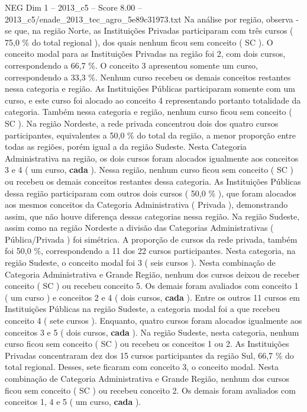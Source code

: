 \begin{textsample}{NEG Dim 1 – 2013\_c5 – Score 8.00 – 2013\_c5/enade\_2013\_tec\_agro\_5e89c31973.txt}
Na análise por região, observa -se que, na região Norte, as Instituições Privadas participaram com três cursos ( 75,0 \% do total regional ), dos quais nenhum ficou sem conceito ( SC ).
O conceito modal para as Instituições Privadas na região foi 2, com dois cursos, correspondendo a 66,7 \%.
O conceito 3 apresentou somente um curso, correspondendo a 33,3 \%.
Nenhum curso recebeu os demais conceitos restantes nessa categoria e região.
As Instituições Públicas participaram somente com um curso, e este curso foi alocado ao conceito 4 representando portanto totalidade da categoria.
Também nessa categoria e região, nenhum curso ficou sem conceito ( SC ).
Na região Nordeste, a rede privada concentrou dois dos quatro cursos participantes, equivalentes a 50,0 \% do total da região, a menor proporção entre todas as regiões, porém igual a da região Sudeste.
Nesta Categoria Administrativa na região, os dois cursos foram alocados igualmente aos conceitos 3 e 4 ( um curso, \textbf{cada} ).
Nessa região, nenhum curso ficou sem conceito ( SC ) ou recebeu os demais conceitos restantes dessa categoria.
As Instituições Públicas dessa região participaram com outros dois cursos ( 50,0 \% ), que foram alocados aos mesmos conceitos da Categoria Administrativa ( Privada ), demonstrando assim, que não houve diferença dessas categorias nessa região.
Na região Sudeste, assim como na região Nordeste a divisão das Categorias Administrativas ( Pública/Privada ) foi simétrica.
A proporção de cursos da rede privada, também foi 50,0 \%, correspondendo a 11 dos 22 cursos participantes.
Nesta categoria, na região Sudeste, o conceito modal foi 3 ( seis cursos ).
Nesta combinação de Categoria Administrativa e Grande Região, nenhum dos cursos deixou de receber conceito ( SC ) ou recebeu conceito 5.
Os demais foram avaliados com conceito 1 ( um curso ) e conceitos 2 e 4 ( dois cursos, \textbf{cada} ).
Entre os outros 11 cursos em Instituições Públicas na região Sudeste, a categoria modal foi a que recebeu conceito 4 ( sete cursos ).
Enquanto, quatro cursos foram alocados igualmente aos conceitos 3 e 5 ( dois cursos, \textbf{cada} ).
Na região Sudeste, nesta categoria, nenhum curso ficou sem conceito ( SC ) ou recebeu os conceitos 1 ou 2.
As Instituições Privadas concentraram dez dos 15 cursos participantes da região Sul, 66,7 \% do total regional.
Desses, sete ficaram com conceito 3, o conceito modal.
Nesta combinação de Categoria Administrativa e Grande Região, nenhum dos cursos ficou sem conceito ( SC ) ou recebeu conceito 2.
Os demais foram avaliados com conceitos 1, 4 e 5 ( um curso, \textbf{cada} ).

\end{textsample}
